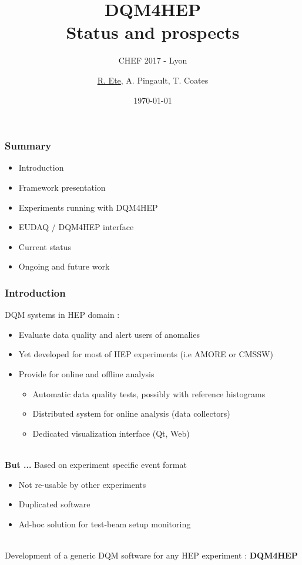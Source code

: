 \documentclass[presentation, 10pt]{beamer}
\title{DQM4HEP \\ Status and prospects}
\subtitle{CHEF 2017 - Lyon}
\author[R. Ete]{\underline{R. Ete}, A. Pingault, T. Coates}
\institute{DESY}
\date{\today}
\begin{document}
\maketitle

\begin{frame}
  \frametitle{Summary}

  \begin{itemize}
    \item Introduction
    \item Framework presentation
    \item Experiments running with DQM4HEP
    \item EUDAQ / DQM4HEP interface
    \item Current status
    \item Ongoing and future work
  \end{itemize}
  
\end{frame}

\begin{frame}
  \frametitle{Introduction}
  \footnotesize
  DQM systems in HEP domain :
  \begin{itemize}
    \item Evaluate data quality and alert users of anomalies
    \item Yet developed for most of HEP experiments (i.e AMORE or CMSSW)
    \item Provide for online and offline analysis
    \begin{itemize}
      \item Automatic data quality tests, possibly with reference histograms
      \item Distributed system for online analysis (data collectors)
      \item Dedicated visualization interface (Qt, Web)
    \end{itemize}
  \end{itemize}
  ~\\
  \textbf{But ...} Based on experiment specific event format
  \begin{itemize}
    \item Not re-usable by other experiments
    \item Duplicated software
    \item Ad-hoc solution for test-beam setup monitoring
  \end{itemize}
  ~\\
  Development of a generic DQM software for any HEP experiment : \textbf{DQM4HEP}
\end{frame}
\end{document}
